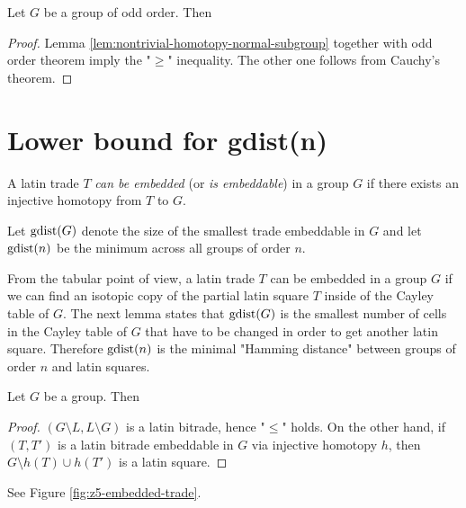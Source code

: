 \begin{lem}
\label{lem:zG-is-zp}
Let $G$ be a group of odd order. Then
%
\end{lem}
\begin{proof}
Lemma \ref{lem:nontrivial-homotopy-normal-subgroup} together with odd order theorem imply the "$\geq$" inequality. The other one follows from Cauchy's theorem.
\end{proof}

\section{Lower bound for gdist(n)}

\begin{defn}
A latin trade $T$ \emph{can be embedded} (or \emph{is embeddable}) in a group $G$ if there exists an injective homotopy from $T$ to $G$.

Let \emph{$\mathop{\mathrm{gdist}}(G)$} denote the size of the smallest trade embeddable in $G$ and let \emph{$\mathop{\mathrm{gdist}}(n)$} be the minimum across all groups of order $n$.
\end{defn}

From the tabular point of view, a latin trade $T$ can be embedded in a group $G$ if we can find an isotopic copy of the partial latin square $T$ inside of the Cayley table of $G$. The next lemma states that $\mathop{\mathrm{gdist}}(G)$ is the smallest number of cells in the Cayley table of $G$ that have to be changed in order to get another latin square. Therefore $\mathop{\mathrm{gdist}}(n)$ is the minimal "Hamming distance" between groups of order $n$ and latin squares.

\begin{lem}
Let $G$ be a group. Then
%
\end{lem}
\begin{proof}
$(G \setminus L, L \setminus G)$ is a latin bitrade, hence "$\leq$" holds. On the other hand, if $(T,T')$ is a latin bitrade embeddable in $G$ via injective homotopy $h$, then $G \setminus h(T) \cup h(T')$ is a latin square.
\end{proof}

\begin{exmp}
See Figure \ref{fig:z5-embedded-trade}.
\end{exmp}%

